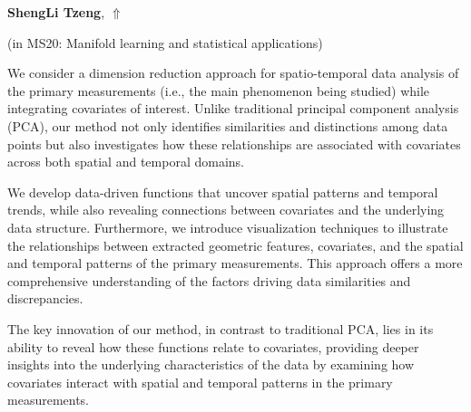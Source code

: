 \documentclass[ILAS2025-program.tex]{subfiles}
\begin{document}
\hypertarget{down0075}{}\begin{ilasabstract}
    
\textbf{ShengLi Tzeng},  \hfill \hyperlink{up0075}{$\Uparrow$}
    
    
(in {\color{mstitle}MS20: Manifold learning and statistical applications})
        
\mtskip
    We consider a dimension reduction approach for spatio-temporal data analysis of the primary measurements (i.e., the main phenomenon being studied) while integrating covariates of interest. Unlike traditional principal component analysis (PCA), our method not only identifies similarities and distinctions among data points but also investigates how these relationships are associated with covariates across both spatial and temporal domains.

We develop data-driven functions that uncover spatial patterns and temporal trends, while also revealing connections between covariates and the underlying data structure. Furthermore, we introduce visualization techniques to illustrate the relationships between extracted geometric features, covariates, and the spatial and temporal patterns of the primary measurements. This approach offers a more comprehensive understanding of the factors driving data similarities and discrepancies.

The key innovation of our method, in contrast to traditional PCA, lies in its ability to reveal how these functions relate to covariates, providing deeper insights into the underlying characteristics of the data by examining how covariates interact with spatial and temporal patterns in the primary measurements.
\end{ilasabstract}
    
\end{document}

